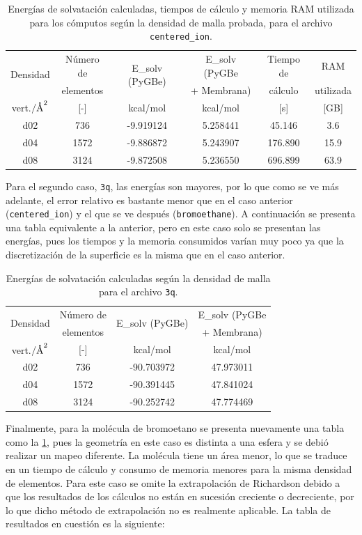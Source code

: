 \documentclass[12pt, twoside, onehalfspace, numbers, spanish]{ezthesis}
\numberwithin{equation}{section}
\newcommand{\angstrom}{\text{\normalfont\AA}}
\begin{document}
\begin{table}[h]
	\centering
	\caption{Energías de solvatación calculadas, tiempos de cálculo y memoria RAM utilizada para los cómputos según la densidad de malla probada, para el archivo \texttt{centered\_ion}.}
	\def\arraystretch{1.2}
	\begin{tabular}{|cccccc|}\hline
		\multirow{2}{*}{Densidad} & Número de & \multirow{2}{*}{E\_solv (PyGBe)} & E\_solv (PyGBe & Tiempo de & RAM\\
		 & elementos &  & + Membrana) & cálculo & utilizada\\\hline
		vert.$/\angstrom^2$ & \rule{0pt}{15pt}[-] & kcal/mol & kcal/mol & [s] & [GB] \\\hline
		d02 & 736 & -9.919124 & 5.258441 & 45.146 & 3.6\\
		d04 & 1572 & -9.886872 & 5.243907 & 176.890 & 15.9\\
		d08 & 3124 & -9.872508 & 5.236550 & 696.899 & 63.9 \\ \hline
	\end{tabular}\label{table:pygbe_centered_ion}
\end{table}
\noindent
Para el segundo caso, \texttt{3q}, las energías son mayores, por lo que como se ve más adelante, el error relativo es bastante menor que en el caso anterior (\texttt{centered\_ion}) y el que se ve después (\texttt{bromoethane}). A continuación se presenta una tabla equivalente a la anterior, pero en este caso solo se presentan las energías, pues los tiempos y la memoria consumidos varían muy poco ya que la discretización de la superficie es la misma que en el caso anterior.

\begin{table}[h]
	\centering
	\caption{Energías de solvatación calculadas según la densidad de malla para el archivo \texttt{3q}.}
	\def\arraystretch{1.2}
	\begin{tabular}{|cccc|}\hline
		\multirow{2}{*}{Densidad} & Número de & \multirow{2}{*}{E\_solv (PyGBe)} & E\_solv (PyGBe \\
		& elementos &  & + Membrana) \\\hline
		\rule{0pt}{15pt} vert.$/\angstrom^2$ & [-] & kcal/mol & kcal/mol \\\hline
		d02 & 736 & -90.703972 & 47.973011 \\
		d04 & 1572 & -90.391445 & 47.841024 \\
		d08 & 3124 & -90.252742 & 47.774469 \\ \hline
	\end{tabular}\label{table:pygbe_3q}
\end{table}
\noindent
Finalmente, para la molécula de bromoetano se presenta nuevamente una tabla como la \ref{table:pygbe_centered_ion}, pues la geometría en este caso es distinta a una esfera y se debió realizar un mapeo diferente. La molécula tiene un área menor, lo que se traduce en un tiempo de cálculo y consumo de memoria menores para la misma densidad de elementos. Para este caso se omite la extrapolación de Richardson debido a que los resultados de los cálculos no están en sucesión creciente o decreciente, por lo que dicho método de extrapolación no es realmente aplicable. La tabla de resultados en cuestión es la siguiente:
\end{document}
